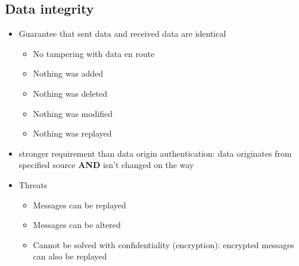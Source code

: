 \documentclass[11pt,british,faculty=ea,layout=titlefont,underline=false,titleUppercase=true,titleUnderline=true,hidelinks]{ugent2016-report}
\begin{document}

		\subsection{Data integrity} \label{sub:data-integrity}
			\begin{itemize}
				\item Guarantee that sent data and received data are identical
					\begin{itemize}
						\item No tampering with data en route
						\item Nothing was added
						\item Nothing was deleted
						\item Nothing was modified
						\item Nothing was replayed
					\end{itemize}
				\item stronger requirement than data origin authentication: data originates from specified source \textbf{AND} isn't changed on the way
				\item Threats
					\begin{itemize}
						\item Messages can be replayed
						\item Messages can be altered
						\item Cannot be solved with confidentiality (encryption): encrypted messages can also be replayed
					\end{itemize}
			\end{itemize}
\end{document}
